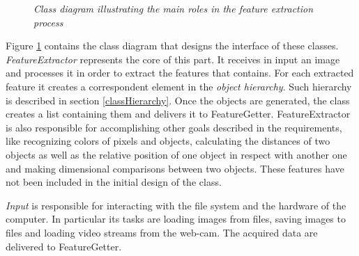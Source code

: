 		\begin{figure}[h]
		  \begin{center} 
		  \end{center} 
		  \caption{\textit{Class diagram illustrating the main roles in the feature extraction process}}  
		  \label{fig:FeatureDesign}
	 	\end{figure}
	
		Figure \ref{fig:FeatureDesign} contains the class diagram that designs the interface of these classes.
		\emph{FeatureExtractor} represents the core of this part. It receives in input an image and processes it in order to extract the features that contains. For each extracted feature it creates a correspondent element in the \emph{object hierarchy}. Such hierarchy is described in section \ref{classHierarchy}. Once the objects are generated, the class creates a list containing them and delivers it to FeatureGetter. 
		FeatureExtractor is also responsible for accomplishing other goals described in the requirements, like recognizing colors of pixels and objects, calculating the distances of two objects as well as the relative position of one object in respect with another one and making dimensional comparisons between two objects. These features have not been included in the initial design of the class. %

		\emph{Input} is responsible for interacting with the file system and the hardware of the computer. In particular its tasks are loading images from files, saving images to files and loading video streams from the web-cam. The acquired data are delivered to FeatureGetter. 

